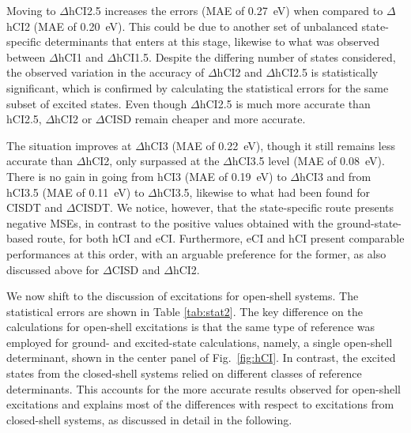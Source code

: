 \documentclass[aip,jcp,reprint,noshowkeys,superscriptaddress]{revtex4-1}
\begin{document}
Moving to $\Delta$hCI2.5 increases the errors (MAE of \SI{0.27}{\eV}) when compared to $\Delta$hCI2 (MAE of \SI{0.20}{\eV}).
This could be due to another set of unbalanced state-specific determinants that enters at this stage, likewise to what was observed between $\Delta$hCI1 and $\Delta$hCI1.5.
Despite the differing number of states considered, the observed variation in the accuracy of $\Delta$hCI2 and $\Delta$hCI2.5 is statistically significant,
which is confirmed by calculating the statistical errors for the same subset of excited states.
Even though $\Delta$hCI2.5 is much more accurate than hCI2.5, $\Delta$hCI2 or $\Delta$CISD remain cheaper and more accurate.

The situation improves at $\Delta$hCI3 (MAE of \SI{0.22}{\eV}), though it still remains less accurate than $\Delta$hCI2,
only surpassed at the $\Delta$hCI3.5 level (MAE of \SI{0.08}{\eV}).
There is no gain in going from hCI3 (MAE of \SI{0.19}{\eV}) to $\Delta$hCI3 and from hCI3.5 (MAE of \SI{0.11}{\eV}) to $\Delta$hCI3.5,
likewise to what had been found for CISDT and $\Delta$CISDT. \cite{Kossoski_2023}
We notice, however, that the state-specific route presents negative MSEs, in contrast to the positive values obtained with the ground-state-based route, for both hCI and eCI.
Furthermore, eCI and hCI present comparable performances at this order, with an arguable preference for the former,
as also discussed above for $\Delta$CISD and $\Delta$hCI2.

We now shift to the discussion of excitations for open-shell systems.
The statistical errors are shown in Table \ref{tab:stat2}.
The key difference on the calculations for open-shell excitations is that the same type of reference was employed for ground- and excited-state calculations, namely,
a single open-shell determinant, shown in the center panel of Fig.~\ref{fig:hCI}.
In contrast, the excited states from the closed-shell systems relied on different classes of reference determinants.
This accounts for the more accurate results observed for open-shell excitations and explains most of the differences with respect to excitations from closed-shell systems, as discussed in detail in the following.
\end{document}
